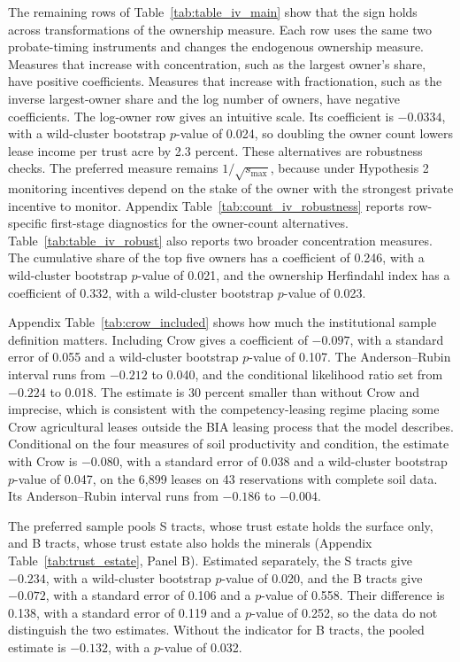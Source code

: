 \documentclass[12pt]{article}
\begin{document}
The remaining rows of Table~\ref{tab:table_iv_main} show that the sign holds across transformations of the ownership measure. Each row uses the same two probate-timing instruments and changes the endogenous ownership measure. Measures that increase with concentration, such as the largest owner's share, have positive coefficients. Measures that increase with fractionation, such as the inverse largest-owner share and the log number of owners, have negative coefficients. The log-owner row gives an intuitive scale. Its coefficient is $-0.0334$, with a wild-cluster bootstrap $p$-value of 0.024, so doubling the owner count lowers lease income per trust acre by 2.3 percent. These alternatives are robustness checks. The preferred measure remains $1/\sqrt{s_{\max}}$, because under Hypothesis 2 monitoring incentives depend on the stake of the owner with the strongest private incentive to monitor. Appendix Table~\ref{tab:count_iv_robustness} reports row-specific first-stage diagnostics for the owner-count alternatives. Table~\ref{tab:table_iv_robust} also reports two broader concentration measures. The cumulative share of the top five owners has a coefficient of 0.246, with a wild-cluster bootstrap $p$-value of 0.021, and the ownership Herfindahl index has a coefficient of 0.332, with a wild-cluster bootstrap $p$-value of 0.023.

Appendix Table~\ref{tab:crow_included} shows how much the institutional sample definition matters. Including Crow gives a coefficient of $-0.097$, with a standard error of 0.055 and a wild-cluster bootstrap $p$-value of 0.107. The Anderson--Rubin interval runs from $-0.212$ to 0.040, and the conditional likelihood ratio set from $-0.224$ to 0.018. The estimate is 30 percent smaller than without Crow and imprecise, which is consistent with the competency-leasing regime placing some Crow agricultural leases outside the BIA leasing process that the model describes. Conditional on the four measures of soil productivity and condition, the estimate with Crow is $-0.080$, with a standard error of 0.038 and a wild-cluster bootstrap $p$-value of 0.047, on the 6,899 leases on 43 reservations with complete soil data. Its Anderson--Rubin interval runs from $-0.186$ to $-0.004$.

The preferred sample pools S tracts, whose trust estate holds the surface only, and B tracts, whose trust estate also holds the minerals (Appendix Table~\ref{tab:trust_estate}, Panel B). Estimated separately, the S tracts give $-0.234$, with a wild-cluster bootstrap $p$-value of 0.020, and the B tracts give $-0.072$, with a standard error of 0.106 and a $p$-value of 0.558. Their difference is 0.138, with a standard error of 0.119 and a $p$-value of 0.252, so the data do not distinguish the two estimates. Without the indicator for B tracts, the pooled estimate is $-0.132$, with a $p$-value of 0.032.
\end{document}
